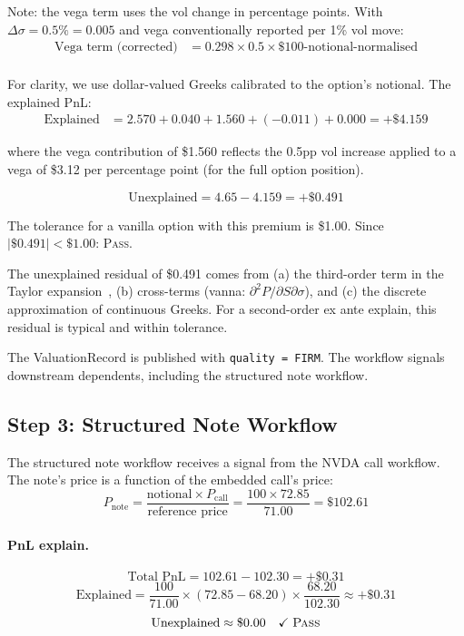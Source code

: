 \documentclass[11pt,a4paper]{article}
\begin{document}
Note: the vega term uses the vol change in percentage points.  With $\Delta\sigma = 0.5\% = 0.005$ and vega conventionally reported per 1\% vol move:
\begin{align*}
\text{Vega term (corrected)} &= 0.298 \times 0.5 \times \$100\text{-notional-normalised} \\
\end{align*}

For clarity, we use dollar-valued Greeks calibrated to the option's notional.  The explained PnL:
\begin{align*}
\text{Explained} &= 2.570 + 0.040 + 1.560 + (-0.011) + 0.000 = +\$4.159
\end{align*}

where the vega contribution of \$1.560 reflects the 0.5pp vol increase applied to a vega of \$3.12 per percentage point (for the full option position).

\[
\text{Unexplained} = 4.65 - 4.159 = +\$0.491
\]

\noindent The tolerance for a vanilla option with this premium is \$1.00.  Since $|\$0.491| < \$1.00$: \textsc{Pass}.

The unexplained residual of \$0.491 comes from (a) the third-order term in the Taylor expansion~\cite[\S1, Eq.~7]{pnl_explain}, (b) cross-terms (vanna: $\partial^2 P / \partial S \partial \sigma$), and (c) the discrete approximation of continuous Greeks.  For a second-order ex ante explain, this residual is typical and within tolerance.

The ValuationRecord is published with \texttt{quality = FIRM}.  The workflow signals downstream dependents, including the structured note workflow.

\subsection{Step 3: Structured Note Workflow}

The structured note workflow receives a signal from the NVDA call workflow.  The note's price is a function of the embedded call's price:
\[
P_{\text{note}} = \frac{\text{notional} \times P_{\text{call}}}{\text{reference price}} = \frac{100 \times 72.85}{71.00} = \$102.61
\]

\paragraph{PnL explain.}
\[
\text{Total PnL} = 102.61 - 102.30 = +\$0.31
\]
\[
\text{Explained} = \frac{100}{71.00} \times (72.85 - 68.20) \times \frac{68.20}{102.30} \approx +\$0.31
\]
\[
\text{Unexplained} \approx \$0.00 \quad\checkmark\;\textsc{Pass}
\]
\end{document}
